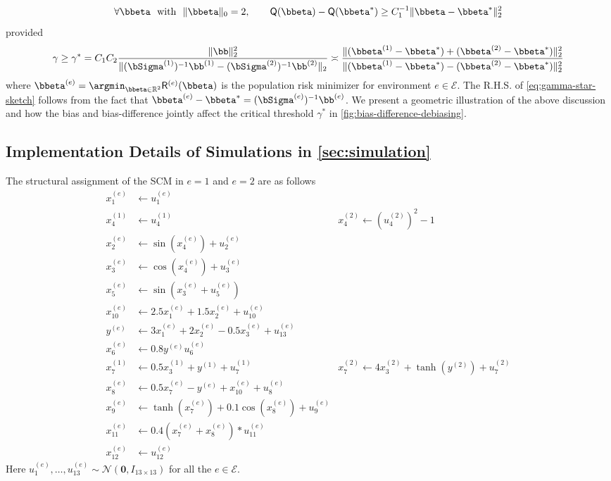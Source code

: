 \documentclass[10pt]{article}
\numberwithin{equation}{section}
\begin{document}
\begin{align*}
    \forall \bbeta ~~\text{with}~~ \|\bbeta \|_0 = 2, ~~~~~~\mathsf{Q}(\bbeta) - \mathsf{Q}(\bbeta^*) \ge C_1^{-1}\| \bbeta - \bbeta^*\|_2^2
\end{align*} provided
\begin{align}
\label{eq:gamma-star-sketch}
    \gamma \ge \gamma^* = C_1 C_2 \frac{\|\bb\|_2^2}{\|(\bSigma^{(1)})^{-1} \bb^{(1)} - (\bSigma^{(2)})^{-1} \bb^{(2)}\|_2} \asymp \frac{\|(\bbeta^{(1)} - \bbeta^*) + (\bbeta^{(2)} - \bbeta^*)\|_2^2}{\|(\bbeta^{(1)} - \bbeta^*) - (\bbeta^{(2)} - \bbeta^*)\|_2^2}
\end{align} where $\bbeta^{(e)} = \argmin_{\bbeta \in \mathbb{R}^2} \mathsf{R}^{(e)}(\bbeta)$ is the  population risk minimizer for environment $e\in \mathcal{E}$. The R.H.S. of \eqref{eq:gamma-star-sketch} follows from the fact that $\bbeta^{(e)} - \bbeta^* = (\bSigma^{(e)})^{-1} \bb^{(e)}$. We present a geometric illustration of the above discussion and how the bias and bias-difference jointly affect the critical threshold $\gamma^*$ in \cref{fig:bias-difference-debiasing}. 




\subsection{Implementation Details of Simulations in \cref{sec:simulation}}
\label{subsec:implementation}

The structural assignment of the SCM in $e=1$ and $e=2$ are as follows
\begin{align*}
    x^{(e)}_1 &\gets u_1^{(e)} \\
    x^{(1)}_4 &\gets u_4^{(1)} \qquad \qquad \qquad \qquad &x^{(2)}_4 \gets (u_4^{(2)})^2-1\\
    x^{(e)}_2 &\gets \sin(x_4^{(e)}) + u_2^{(e)} \\
    x^{(e)}_3 &\gets \cos(x_4^{(e)}) + u_3^{(e)} \\
    x^{(e)}_5 &\gets \sin(x_3^{(e)} + u_5^{(e)}) \\
    x^{(e)}_{10} &\gets 2.5 x_1^{(e)} + 1.5 x_2^{(e)} + u_{10}^{(e)} \\
    y^{(e)} &\gets 3 x_1^{(e)} + 2x_2^{(e)} - 0.5 x_3^{(e)} + u_{13}^{(e)} \\
    x_6^{(e)} &\gets 0.8 y^{(e)} u_6^{(e)} \\
    x_7^{(1)} &\gets 0.5 x_3^{(1)} + y^{(1)} + u_7^{(1)} & x_7^{(2)} \gets 4 x_3^{(2)} + \tanh(y^{(2)}) + u_7^{(2)} \\
    x_8^{(e)} &\gets 0.5 x_7^{(e)} - y^{(e)} + x_{10}^{(e)} + u_8^{(e)} \\
    x_9^{(e)} &\gets \tanh(x_7^{(e)}) + 0.1 \cos(x_8^{(e)}) + u_9^{(e)} \\
    x^{(e)}_{11} &\gets 0.4 (x_7^{(e)} + x_8^{(e)}) * u_{11}^{(e)} \\
    x_{12}^{(e)} &\gets u^{(e)}_{12}
\end{align*} 
Here $u^{(e)}_1,\ldots, u^{(e)}_{13} \sim \mathcal{N}(\bm{0}, I_{13\times 13})$ for all the $e\in \mathcal{E}$.
\end{document}
